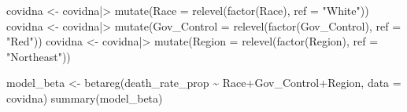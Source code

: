 \documentclass[
  letterpaper,
  DIV=11,
  numbers=noendperiod]{scrartcl}
\newenvironment{Shaded}{\begin{snugshade}}{\end{snugshade}}
\newcommand{\AttributeTok}[1]{\textcolor[rgb]{0.40,0.45,0.13}{#1}}
\newcommand{\FunctionTok}[1]{\textcolor[rgb]{0.28,0.35,0.67}{#1}}
\newcommand{\NormalTok}[1]{\textcolor[rgb]{0.00,0.23,0.31}{#1}}
\newcommand{\OtherTok}[1]{\textcolor[rgb]{0.00,0.23,0.31}{#1}}
\newcommand{\SpecialCharTok}[1]{\textcolor[rgb]{0.37,0.37,0.37}{#1}}
\newcommand{\StringTok}[1]{\textcolor[rgb]{0.13,0.47,0.30}{#1}}
\begin{document}
\begin{Shaded}
\begin{Highlighting}[]
\NormalTok{covidna }\OtherTok{\textless{}{-}}\NormalTok{ covidna}\SpecialCharTok{|\textgreater{}}
  \FunctionTok{mutate}\NormalTok{(}\AttributeTok{Race =} \FunctionTok{relevel}\NormalTok{(}\FunctionTok{factor}\NormalTok{(Race), }\AttributeTok{ref =} \StringTok{"White"}\NormalTok{))}
\NormalTok{covidna }\OtherTok{\textless{}{-}}\NormalTok{ covidna}\SpecialCharTok{|\textgreater{}}
  \FunctionTok{mutate}\NormalTok{(}\AttributeTok{Gov\_Control =} \FunctionTok{relevel}\NormalTok{(}\FunctionTok{factor}\NormalTok{(Gov\_Control), }\AttributeTok{ref =} \StringTok{"Red"}\NormalTok{))}
\NormalTok{covidna }\OtherTok{\textless{}{-}}\NormalTok{ covidna}\SpecialCharTok{|\textgreater{}}
  \FunctionTok{mutate}\NormalTok{(}\AttributeTok{Region =} \FunctionTok{relevel}\NormalTok{(}\FunctionTok{factor}\NormalTok{(Region), }\AttributeTok{ref =} \StringTok{"Northeast"}\NormalTok{))}
\end{Highlighting}
\end{Shaded}

\begin{Shaded}
\begin{Highlighting}[]
\NormalTok{model\_beta }\OtherTok{\textless{}{-}} \FunctionTok{betareg}\NormalTok{(death\_rate\_prop }\SpecialCharTok{\textasciitilde{}}\NormalTok{ Race}\SpecialCharTok{+}\NormalTok{Gov\_Control}\SpecialCharTok{+}\NormalTok{Region, }\AttributeTok{data =}\NormalTok{ covidna)}
\FunctionTok{summary}\NormalTok{(model\_beta)}
\end{Highlighting}
\end{Shaded}
\end{document}
